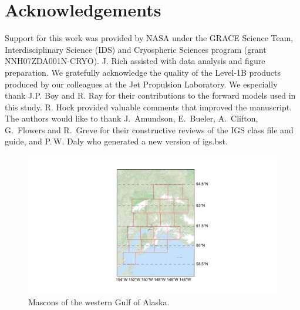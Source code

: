 \documentclass[review]{igs}
\begin{document}
\section{Acknowledgements}

Support for this work was provided by NASA under the GRACE Science Team, Interdisciplinary Science (IDS) and Cryospheric Sciences program (grant NNH07ZDA001N-CRYO). J. Rich assisted with data analysis and figure preparation. We gratefully acknowledge the quality of the Level-1B products produced by our colleagues at the Jet Propulsion Laboratory. We especially thank J.P. Boy and R. Ray for their contributions to the forward models used in this study. R. Hock provided valuable comments that improved the manuscript. The authors would like to thank J.~Amundson, E.~Bueler, A.~Clifton, G.~Flowers and R.~Greve for their constructive reviews of the IGS class file and guide, and P.\,W. Daly who generated a new version of igs.bst.




\begin{figure}
\noindent\includegraphics[width=178mm]{figures/westernMap} \centering \caption{Mascons of the western Gulf of Alaska.} \label{fig:wGOA_map}
\end{figure}
\end{document}
